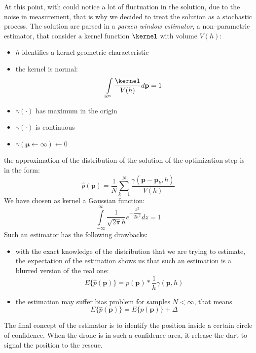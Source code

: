 At this point, with could notice a lot of fluctuation in the solution, due to the noise in measurement, that is why we decided to treat the solution as a stochastic process. The solution are parsed in a \emph{parzen window estimator}, a non--parametric estimator, that consider a kernel function $\kernel$ with volume $V(h)$:
\begin{itemize}
\item $h$ identifies a kernel geometric characteristic
\item the kernel is normal: 
\[ \int\limits_{\mathbb{R}^n} \dfrac{\kernel}{V(h)}d\mathbf{p} = 1 \]
\item $\gamma(\cdot)$ has maximum in the origin
\item $\gamma(\cdot)$ is continuous
\item $\gamma(\pmb{\mu}\leftarrow\infty)\leftarrow 0$
\end{itemize}
the approximation of the distribution of the solution of the optimization step is in the form:
\begin{equation}
\hat{p}(\mathbf{p}) = \dfrac{1}{N}\sum\limits_{k=1}^{N} \dfrac{\gamma(\mathbf{p}-\mathbf{p}_k,h)}{V(h)}
\end{equation}
We have chosen as kernel a Gaussian function: 
\[ \int\limits_{-\infty}^{\infty} \dfrac{1}{\sqrt{2\pi} h} e^{-\dfrac{z^2}{2 h^2}} dz = 1 \]
Such an estimator has the following drawbacks:
\begin{itemize}
\item with the exact knowledge of the distribution that we are trying to estimate, the expectation of the estimation shows us that such an estimation is a blurred version of the real one: \[{E\{\hat{p}(\mathbf{p})\} = p(\mathbf{p}) * \dfrac{1}{h} \gamma(\mathbf{p},h)}\]
\item the estimation may suffer bias problem for samples $N<\infty$, that means \[{E\{\hat{p}(\mathbf{p})\}=E\{{p}(\mathbf{p})\} + \Delta}\]
\end{itemize}

The final concept of the estimator is to identify the position inside a certain circle of confidence. When the drone is in such a confidence area, it release the dart to signal the position to the rescue.